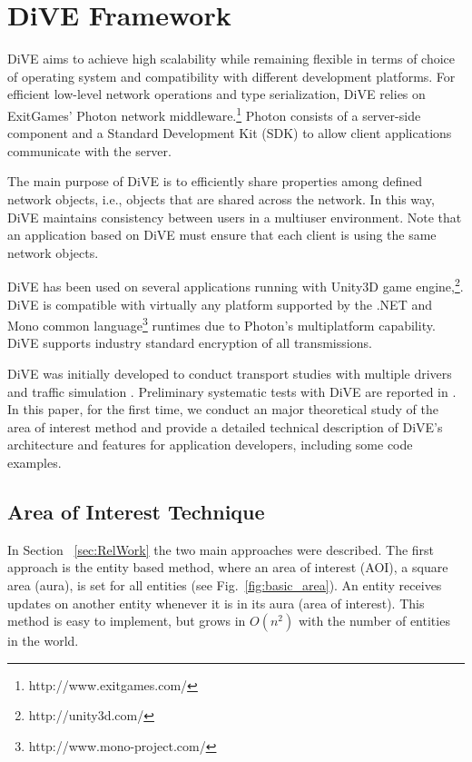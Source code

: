 \documentclass[]{elsarticle}
\begin{document}
\section{DiVE Framework}\label{sec:DiVE}

DiVE aims to achieve high scalability while remaining flexible in terms of choice of operating system and compatibility with different development platforms. For efficient low-level network operations and type serialization, DiVE relies on ExitGames' Photon network middleware.\footnote{http://www.exitgames.com/} Photon consists of a server-side component and a Standard Development Kit (SDK) to allow client applications communicate with the server.

The main purpose of DiVE is to efficiently share properties among defined network objects, i.e., objects that are shared across the network. In this way, DiVE maintains consistency between users in a multiuser environment. Note that an application based on DiVE must ensure that each client is using the same network objects.

DiVE has been used on several applications \cite{Madruga+others.2012,Berg+others.2012,Gajananan+others.2013,Madruga+Prendinger.2013} running with Unity3D game engine,\footnote{http://unity3d.com/}. DiVE is compatible with virtually any platform supported by the .NET and Mono common language\footnote{http://www.mono-project.com/} runtimes due to Photon's multiplatform capability. DiVE supports industry standard encryption of all transmissions.

DiVE was initially developed to conduct transport studies with multiple drivers and traffic simulation \cite{Prendinger+others.2013}.
 Preliminary systematic tests with DiVE are reported in \cite{Prendinger+others.2014}. In this paper, for the first time, we conduct an major theoretical study of the area of interest method and provide a detailed technical description of DiVE's architecture and features for application developers, including some code examples.


\subsection{Area of Interest Technique}\label{sec:AOItechnique}
In Section ~\ref{sec:RelWork} the two main approaches were described. The first approach is the entity based method, where an area of interest (AOI), a square area (aura), is set for all entities (see Fig.~\ref{fig:basic_area}). An entity receives updates on another entity whenever it is in its aura (area of interest). This method is easy to implement, but grows in $O(n^2)$ with the number of entities in the world.
\end{document}
